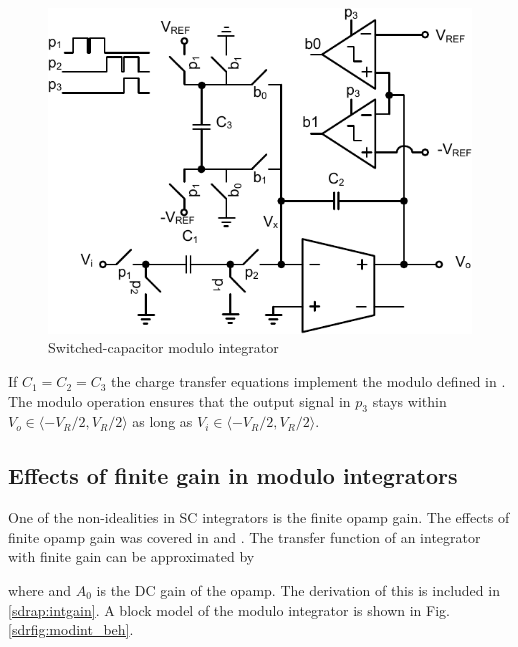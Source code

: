 




\begin{figure}[htbp]
\centerline{ \includegraphics[width=\myfigwidth]{graphics/sc_mod}}
  \caption{Switched-capacitor modulo integrator}
  \label{sdrfig:scmod}
\end{figure}

If $C_1 = C_2 = C_3$ the charge transfer equations implement the
modulo defined in . The modulo operation ensures that the
output signal in $p_3$ stays within $V_{o} \in \langle -V_R/2, V_R/2
\rangle$ as long as $V_{i} \in \langle -V_R/2, V_R/2 \rangle$. 

\subsection{Effects of finite gain in modulo integrators}
One of the non-idealities in SC integrators is the
finite opamp gain. The effects of finite opamp gain was covered in \cite{temes80} and
\cite{martin81}.  The transfer function of an integrator with finite
gain can be approximated by 

where
and $A_0$ is the DC gain of the opamp. The derivation of this is included in \myappname
\ref{sdrap:intgain}. A block 
model of the modulo integrator is shown in Fig. \ref{sdrfig:modint_beh}.

